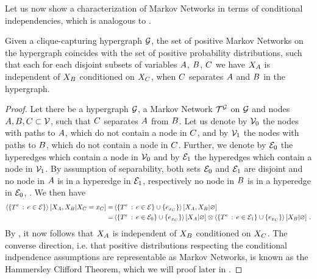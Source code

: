 Let us now show a characterization of Markov Networks in terms of conditional independencies, which is analogous to .

\begin{theorem}\label{the:condIndMN}
	Given a clique-capturing hypergraph $\mathcal{G}$, the set of positive Markov Networks on the hypergraph coincides with the set of positive probability distributions, such that each for each disjoint subsets of variables $A$, $B$, $C$ we have $X_{A}$ is independent of $X_{B}$ conditioned on $X_{C}$, when $C$ separates $A$ and $B$ in the hypergraph. %
\end{theorem}
\begin{proof}
	Let there be a hypergraph $\mathcal{G}$, a Markov Network $\mathcal{T}^{\mathcal{G}}$ on $\mathcal{G}$ and nodes $A,B,C \subset \mathcal{V}$, such that $C$ separates $A$ from $B$.
	Let us denote by $\mathcal{V}_0$ the nodes with paths to $A$, which do not contain a node in $C$, and by $\mathcal{V}_1$ the nodes with paths to $B$, which do not contain a node in $C$.
	Further, we denote by $\mathcal{E}_0$ the hyperedges which contain a node in $\mathcal{V}_0$ and by $\mathcal{E}_1$ the hyperedges which contain a node in $\mathcal{V}_1$.
	By assumption of separability, both sets $\mathcal{E}_0$ and $\mathcal{E}_1$ are disjoint and no node in $A$ is in a hyperedge in $\mathcal{E}_1$, respectively no node in $B$ is in a hyperedge in $\mathcal{E}_0$, .
	We then have
	\begin{align*}
		\left\langle \{T^{e}\, : \, e\in\mathcal{E}\}\right\rangle \left[ X_{A},X_{B} | X_{C}=x_{C} \right] 
		= & \left\langle \{T^{e}\, : \, e\in\mathcal{E}\}\cup\{e_{x_{C}}\}\right\rangle \left[ X_{A},X_{B} | \varnothing \right] \\
		= &  \left\langle \{T^{e}\, : \, e\in\mathcal{E}_0\}\cup\{e_{x_{C}}\}\right\rangle \left[ X_{A} | \varnothing \right]
		\otimes \left\langle \{T^{e}\, : \, e\in\mathcal{E}_1\}\cup\{e_{x_{C}}\}\right\rangle \left[ X_{B} | \varnothing \right] \, .
	\end{align*}
	By , it now follows that $X_{A}$ is independent of $X_{B}$ conditioned on $X_{C}$.
	The converse direction, i.e. that positive distributions respecting the conditional indpendence assumptions are representable as Markov Networks, is known as the Hammersley Clifford Theorem, 
	which we will proof later in .
\end{proof}

